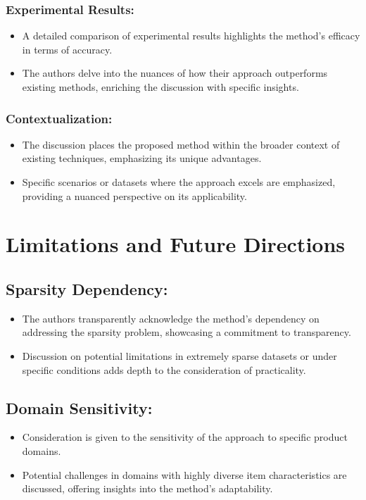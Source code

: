 \documentclass{article}
\begin{document}
\subsubsection{Experimental Results:}
\begin{itemize}
  \item A detailed comparison of experimental results highlights the method's efficacy in terms of accuracy.
  \item The authors delve into the nuances of how their approach outperforms existing methods, enriching the discussion with specific insights.
\end{itemize}

\subsubsection{Contextualization:}
\begin{itemize}
  \item The discussion places the proposed method within the broader context of existing techniques, emphasizing its unique advantages.
  \item Specific scenarios or datasets where the approach excels are emphasized, providing a nuanced perspective on its applicability.
\end{itemize}

\section{Limitations and Future Directions}
\subsection{Sparsity Dependency:}
\begin{itemize}
  \item The authors transparently acknowledge the method's dependency on addressing the sparsity problem, showcasing a commitment to transparency.
  \item Discussion on potential limitations in extremely sparse datasets or under specific conditions adds depth to the consideration of practicality.
\end{itemize}

\subsection{Domain Sensitivity:}
\begin{itemize}
  \item Consideration is given to the sensitivity of the approach to specific product domains.
  \item Potential challenges in domains with highly diverse item characteristics are discussed, offering insights into the method's adaptability.
\end{itemize}
\end{document}
